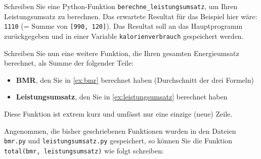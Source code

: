 \begin{myexercise}
	Schreiben Sie eine Python-Funktion \lstinline|berechne_leistungsumsatz|, um Ihren Leistungsumsatz zu berechnen. Das erwartete Resultat für das Beispiel hier wäre: \lstinline|1110| (= Summe von \lstinline|[990, 120]|). Das Resultat soll an das Hauptprogramm zurückgegeben und in einer Variable \texttt{kalorienverbrauch} gespeichert werden. %
	\begin{myanswer} %
		
	\end{myanswer}

\end{myexercise}
%
\begin{myexercise}
	Schreiben Sie nun eine weitere Funktion, die Ihren gesamten Energieumsatz berechnet, als Summe der folgender Teile:
	\begin{itemize}
		\item \textbf{\gls{BMR}}, den Sie in \cref{ex:bmr} berechnet haben (Durchschnitt der drei Formeln)
		\item \textbf{Leistungsumsatz}, den Sie in \cref{ex:leistungsumsatz} berechnet haben
	\end{itemize}
	Diese Funktion ist extrem kurz und umfässt nur eine einzige (neue) Zeile.
	\begin{myanswer} %
		Angenommen, die bisher geschriebenen Funktionen wurden in den Dateien \texttt{bmr.py} und \texttt{leistungsumsatz.py} gespeichert, so können Sie die Funktion \lstinline|total(bmr, leistungsumsatz)| wie folgt schreiben:
		
	\end{myanswer}
\end{myexercise}





